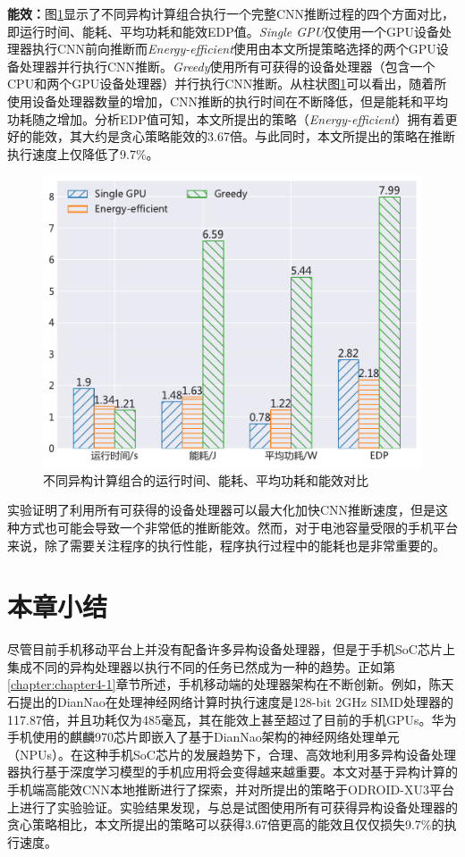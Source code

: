 \textbf{能效：}图\ref{figure:figure35}显示了不同异构计算组合执行一个完整CNN推断过程的四个方面对比，即运行时间、能耗、平均功耗和能效EDP值。\emph{Single GPU}仅使用一个GPU设备处理器执行CNN前向推断而\emph{Energy-efficient}使用由本文所提策略选择的两个GPU设备处理器并行执行CNN推断。\emph{Greedy}使用所有可获得的设备处理器（包含一个CPU和两个GPU设备处理器）并行执行CNN推断。从柱状图\ref{figure:figure35}可以看出，随着所使用设备处理器数量的增加，CNN推断的执行时间在不断降低，但是能耗和平均功耗随之增加。分析EDP值可知，本文所提出的策略（\emph{Energy-efficient}）拥有着更好的能效，其大约是贪心策略能效的3.67倍。与此同时，本文所提出的策略在推断执行速度上仅降低了9.7\%。

\begin{figure}[htbp]
    \centering
    \includegraphics[height=0.4\textwidth]{figures/hc_gpu.pdf}
    \caption{不同异构计算组合的运行时间、能耗、平均功耗和能效对比}\label{figure:figure35}
\end{figure}

实验证明了利用所有可获得的设备处理器可以最大化加快CNN推断速度，但是这种方式也可能会导致一个非常低的推断能效。然而，对于电池容量受限的手机平台来说，除了需要关注程序的执行性能，程序执行过程中的能耗也是非常重要的\cite{brooks2000power}。

\section{本章小结}

尽管目前手机移动平台上并没有配备许多异构设备处理器，但是于手机SoC芯片上集成不同的异构处理器以执行不同的任务已然成为一种的趋势。正如第\ref{chapter:chapter4-1}章节所述，手机移动端的处理器架构在不断创新。例如，陈天石提出的DianNao在处理神经网络计算时执行速度是128-bit 2GHz SIMD处理器的117.87倍，并且功耗仅为485毫瓦\cite{chen2014diannao}，其在能效上甚至超过了目前的手机GPUs。华为手机使用的麒麟970芯片即嵌入了基于DianNao架构的神经网络处理单元（NPUs）。在这种手机SoC芯片的发展趋势下，合理、高效地利用多异构设备处理器执行基于深度学习模型的手机应用将会变得越来越重要。本文对基于异构计算的手机端高能效CNN本地推断进行了探索，并对所提出的策略于ODROID-XU3平台上进行了实验验证。实验结果发现，与总是试图使用所有可获得异构设备处理器的贪心策略相比，本文所提出的策略可以获得3.67倍更高的能效且仅仅损失9.7\%的执行速度。

\cleardoublepage 